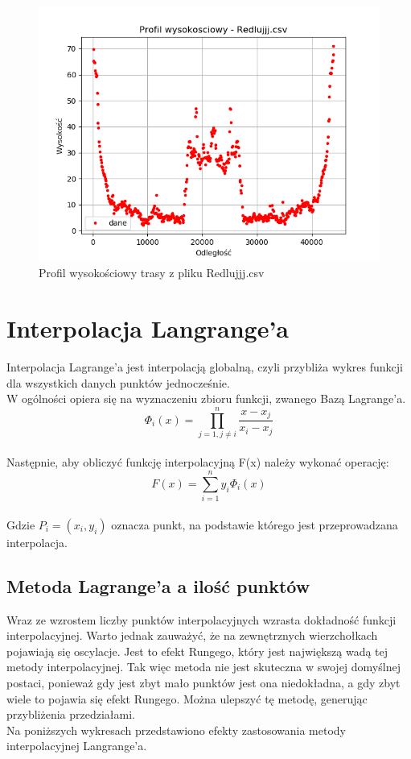 \documentclass{article} %
\begin{document}
\begin{figure}
    \begin{minipage}[b]{0.4\textwidth}
        \includegraphics[width=\textwidth]{profile_wysokosciowe/red_pw.png}
        \caption{Profil wysokościowy trasy z pliku Redlujjj.csv}
    \end{minipage}
\end{figure}

\section{Interpolacja Langrange'a}
Interpolacja Lagrange'a jest interpolacją globalną, 
czyli przybliża wykres funkcji dla
wszystkich danych punktów jednocześnie. \\
W ogólności opiera się na wyznaczeniu zbioru funkcji,
 zwanego Bazą Lagrange'a. \\
 \begin{equation}
    \Phi_{i}(x) = \prod_{j=1, j \neq i}^{n} \frac{x-x_{j}}{x_{i} - x_{j}}
 \end{equation} \\
 Następnie, aby obliczyć funkcję interpolacyjną F(x) należy wykonać operację: \\
 \begin{equation} 
    F(x) = \sum_{i=1}^{n} y_{i} \Phi_{i}(x)
 \end{equation} \\
 Gdzie $P_{i} = (x_{i}, y_{i})$ oznacza punkt, 
 na podstawie którego jest przeprowadzana interpolacja.  
 \newpage
 \subsection{Metoda Lagrange'a a ilość punktów}
 Wraz ze wzrostem liczby punktów interpolacyjnych wzrasta dokładność funkcji interpolacyjnej.
 Warto jednak zauważyć, że na zewnętrznych wierzchołkach pojawiają się oscylacje. Jest to efekt Rungego,
 który jest największą wadą tej metody interpolacyjnej. Tak więc metoda nie jest skuteczna
 w swojej domyślnej postaci, ponieważ gdy jest zbyt mało punktów jest ona niedokładna,
 a gdy zbyt wiele to pojawia się efekt Rungego. Można ulepszyć tę metodę, generując przybliżenia przedziałami. \\
 Na poniższych wykresach przedstawiono efekty zastosowania metody interpolacyjnej Langrange'a.
\end{document}
